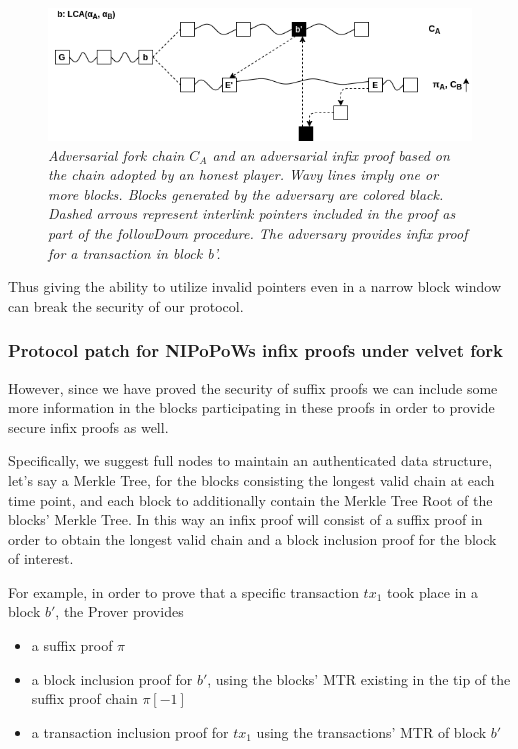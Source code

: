 \documentclass[10pt,a4paper]{article}
\begin{document}
\begin{figure}[h!]
	\begin{center}
		\includegraphics[scale=0.52]{figures/infix_attack.png}
	\end{center}
	\caption{\textit{Adversarial fork chain $C_A$ and an adversarial infix proof based on the chain adopted by an honest player. Wavy lines imply one or more blocks. Blocks generated by the adversary are colored black. Dashed arrows represent interlink pointers included in the proof as part of the \textit{followDown} procedure. The adversary provides infix proof for a transaction in block b'. }}
	\label{fig:infix_attack}
\end{figure}

Thus giving the ability to utilize invalid pointers even in a narrow block window can break the security of our protocol. 

\subsubsection*{Protocol patch for NIPoPoWs infix proofs under velvet fork}
However, since we have proved the security of suffix proofs we can include some more information in the blocks participating in these proofs in order to provide secure infix proofs as well.
 
Specifically, we suggest full nodes to maintain an authenticated data structure, let's say a Merkle Tree, for the blocks consisting the longest valid chain at each time point, and each block to additionally contain the Merkle Tree Root of  the blocks' Merkle Tree. In this way an infix proof will consist of a suffix proof in order to obtain the longest valid chain and a block inclusion proof for the block of interest. 

For example, in order to prove that a specific transaction $tx_1$ took place in a block $b'$, the Prover provides
\begin{itemize}
\item a suffix proof $\pi$
\item a block inclusion proof for $b'$, using the blocks' MTR existing in the tip of the suffix proof chain $\pi[-1]$
\item a transaction inclusion proof for $tx_1$ using the transactions' MTR of block $b'$
\end{itemize}
\end{document}

